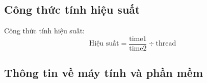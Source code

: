 







\subsection{Công thức tính hiệu suất}


Công thức tính hiệu suất:
\begin{equation}
 \text{{Hiệu suất}} = \frac{{\text{{time1}}}}{{\text{{time2}}}} \div \text{{thread}}
\end{equation}


\subsection{Thông tin về máy tính và phần mềm}




 
 
 